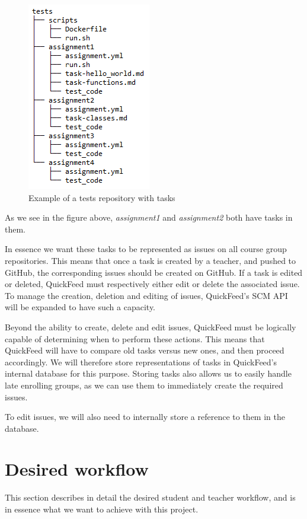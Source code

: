 \begin{figure}[ht]
    \centering
    \includegraphics[scale=0.8]{photos/tests-repository-structure-tasks.PNG}
    \caption{Example of a tests repository with tasks}
    \label{fig:tests-repository-structure-tasks}
\end{figure}

As we see in the figure above, \textit{assignment1} and \textit{assignment2} both have tasks in them.

In essence we want these tasks to be represented as issues on all course group repositories.
This means that once a task is created by a teacher, and pushed to GitHub, the corresponding issues should be created on GitHub.
If a task is edited or deleted, QuickFeed must respectively either edit or delete the associated issue.
To manage the creation, deletion and editing of issues, QuickFeed's SCM API will be expanded to have such a capacity.

Beyond the ability to create, delete and edit issues, QuickFeed must be logically capable of determining when to perform these actions.
This means that QuickFeed will have to compare old tasks versus new ones, and then proceed accordingly.
We will therefore store representations of tasks in QuickFeed's internal database for this purpose.
Storing tasks also allows us to easily handle late enrolling groups, as we can use them to immediately create the required issues.

To edit issues, we will also need to internally store a reference to them in the database.


\section{Desired workflow}
This section describes in detail the desired student and teacher workflow, and is in essence what we want to achieve with this project.

